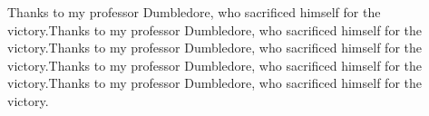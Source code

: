 \begin{acknowledgement}%

Thanks to my professor Dumbledore, who sacrificed himself for the victory.Thanks to my professor Dumbledore, who sacrificed himself for the victory.Thanks to my professor Dumbledore, who sacrificed himself for the victory.Thanks to my professor Dumbledore, who sacrificed himself for the victory.Thanks to my professor Dumbledore, who sacrificed himself for the victory.


\end{acknowledgement}